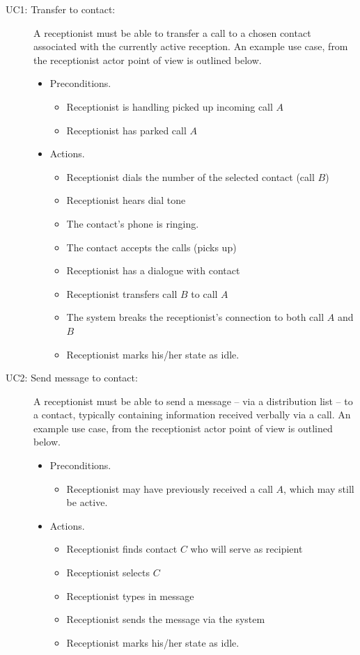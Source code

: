 \documentclass[10pt]{scrreprt}
\begin{document}
\begin{description}
  \item[UC1: Transfer to contact:] A receptionist must be able to transfer a call to a chosen contact associated with the currently active reception. An example use case, from the receptionist actor point of view is outlined below.
  \begin{itemize}
    \item Preconditions.
    \begin{itemize}
      \item Receptionist is handling picked up incoming call $A$
      \item Receptionist has parked call $A$
    \end{itemize}
    \item Actions.
    \begin{itemize}
      \item Receptionist dials the number of the selected contact (call $B$)
      \item Receptionist hears dial tone
      \item The contact's phone is ringing.
      \item The contact accepts the calls (picks up)
      \item Receptionist has a dialogue with contact
      \item Receptionist transfers call $B$ to call $A$
      \item The system breaks the receptionist's connection to both call $A$ and $B$    
      \item Receptionist marks his/her state as idle.
    \end{itemize}
  \end{itemize}

  \item[UC2: Send message to contact:] A receptionist must be able to send a message -- via a distribution list -- to a contact, typically containing information received verbally via a call. An example use case, from the receptionist actor point of view is outlined below.
  \begin{itemize}
    \item Preconditions.
    \begin{itemize}
      \item Receptionist may have previously received a call $A$, which may still be active.
    \end{itemize}
    \item Actions.
    \begin{itemize}
      \item Receptionist finds contact $C$ who will serve as recipient
      \item Receptionist selects $C$
      \item Receptionist types in message
      \item Receptionist sends the message via the system
      \item Receptionist marks his/her state as idle.
    \end{itemize}
  \end{itemize}
\end{description}
\end{document}
